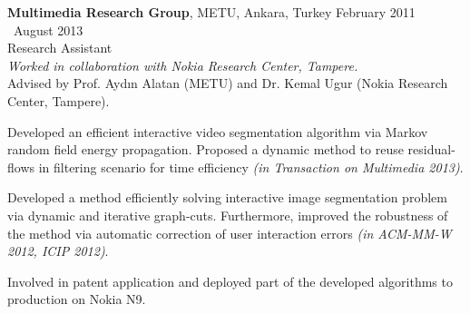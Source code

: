     \textbf{Multimedia Research Group}, METU, Ankara, Turkey \hfill February 2011 \textendash ~August 2013\vspace{0mm}\\\vspace{0mm}
	\hspace{-1mm}Research Assistant  \hfill \vspace{2mm}\\\vspace{0mm}
	\hspace{-1mm}\emph{Worked in collaboration with Nokia Research Center, Tampere.} \\
	Advised by Prof. Ayd\i n Alatan (METU) and Dr. Kemal Ugur (Nokia Research Center, Tampere).

	Developed an efficient interactive video segmentation algorithm via Markov random field energy propagation. Proposed a dynamic method to reuse residual-flows in filtering scenario for time efficiency \emph{(in Transaction on Multimedia 2013)}.

	Developed a method efficiently solving interactive image segmentation problem via dynamic and iterative graph-cuts. Furthermore, improved the robustness of the method via automatic correction of user interaction errors \emph{(in ACM-MM-W 2012, ICIP 2012)}.
	
	Involved in patent application and deployed part of the developed algorithms to production on Nokia N9.
